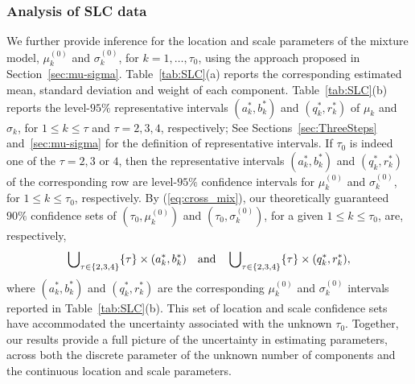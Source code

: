 \documentclass[12pt]{article}
\theoremstyle{shortspace}
\begin{document}
\subsubsection{Analysis of SLC data}
We further provide  inference for the location and scale parameters of the mixture model, 
$\mu_k^{(0)}$ and $\sigma_k^{(0)}$, for $k = 1, \ldots, \tau_0$, using the approach proposed in Section~\ref{sec:mu-sigma}.
Table~\ref{tab:SLC}(a) reports the corresponding estimated mean, standard deviation and weight of each component.  
Table~\ref{tab:SLC}(b) reports the level-$95\%$ representative intervals $(a_k^*, b_k^*)$ and $(q_k^*, r_k^*)$ of 
$\mu_k$ and $\sigma_k$, 
for $1 \leq k \leq \tau$ and $\tau = 2, 3, 4$, respectively; See Sections~\ref{sec:ThreeSteps} and~\ref{sec:mu-sigma} for the definition of representative intervals. 
If $\tau_0$ is indeed one of the $\tau = 2, 3$ or $4$, then
the representative intervals $(a_k^*, b_k^*)$ and $(q_k^*, r_k^*)$ of the corresponding row are level-$95\%$ confidence intervals for
$\mu_k^{(0)}$ and $\sigma_k^{(0)}$, 
for $1 \leq k \leq \tau_0$, respectively.
By (\ref{eq:cross_mix}),  
our theoretically guaranteed $90\%$ confidence sets of  $(\tau_0,\mu_k^{(0)})$ and $(\tau_0,\sigma_k^{(0)})$, for a given  $1 \leq k \leq \tau_0$, are,  respectively, 
$$
\bigcup\nolimits_{\tau \in \{2,3,4\}} \{\tau\} \times (a_k^*, b_k^*) \quad \hbox{and} \quad \bigcup\nolimits_{\tau \in \{2,3,4\}} \{\tau\} \times (q_k^*, r_k^*),
$$ where $(a_k^*, b_k^*)$ and $(q_k^*, r_k^*)$ are the corresponding $\mu_k^{(0)}$ and $\sigma_k^{(0)}$ intervals reported in Table~\ref{tab:SLC}(b). 
This set of location and scale confidence sets 
have accommodated the uncertainty associated with the unknown $\tau_0$. 
Together, our results provide a full picture of the uncertainty in estimating parameters, across both the discrete parameter of the unknown number of components and the continuous location and scale parameters.   
\end{document}
